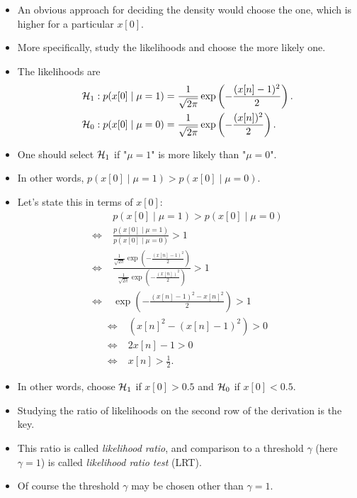 \documentclass[10pt, aspectratio=169]{beamer} %
\newcommand{\x}{{\bf x}}
\begin{document}
\begin{frame}[allowframebreaks=0.8]
\begin{itemize}
\item An obvious approach for deciding the density would choose
the one, which is higher for a particular $x[0]$.
\item More specifically, study the likelihoods and choose the more likely one.
\item The likelihoods are
\begin{align*}
{\cal H}_1 &: p(x[0]\mid \mu=1) =  \frac{1}{\sqrt{2\pi}}\exp\left(-\frac{(x[n]-1)^2}{2}\right).\\
{\cal H}_0 &: p(x[0]\mid \mu=0) =  \frac{1}{\sqrt{2\pi}}\exp\left(-\frac{(x[n])^2}{2}\right).
\end{align*}
\item One should select ${\cal H}_1$ if "$\mu = 1$" is more likely than "$\mu = 0$".
\item In other words, $p(x[0]\mid \mu=1) > p(x[0]\mid \mu=0)$.
\item Let's state this in terms of $x[0]$:
\begin{align*}
&\; p(x[0]\mid \mu=1) > p(x[0]\mid \mu=0) \\
\Leftrightarrow &\; \frac{p(x[0]\mid \mu=1)}{p(x[0]\mid \mu=0)} > 1\\
\Leftrightarrow &\; \frac{\frac{1}{\sqrt{2\pi}}\exp\left(-\frac{(x[n]-1)^2}{2}\right)}{\frac{1}{\sqrt{2\pi}}\exp\left(-\frac{(x[n])^2}{2}\right)} > 1\\
\Leftrightarrow &\; \exp\left(-\frac{(x[n]-1)^2 - x[n]^2}{2}\right) > 1
\end{align*}
\framebreak
\begin{align*}
\Leftrightarrow &\; (x[n]^2 - (x[n]-1)^2) > 0\\
\Leftrightarrow &\; 2x[n] - 1 > 0\\
\Leftrightarrow &\; x[n] > \frac12.
\end{align*}

\item In other words, choose ${\cal H}_1$ if $x[0] > 0.5$ and ${\cal H}_0$ if
$x[0] < 0.5$.

\item Studying the ratio of likelihoods on the second row of the derivation 
is the key. 

\item This ratio is called \emph{likelihood ratio}, and comparison
to a threshold $\gamma$ (here $\gamma = 1$) is called \emph{likelihood ratio test} (LRT).

\item Of course the threshold $\gamma$ may be chosen other than $\gamma = 1$.

\end{itemize}
\end{frame}
\end{document}
